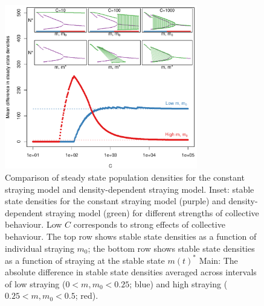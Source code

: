 \documentclass{revtex4}
\begin{document}
\begin{figure}
  \captionsetup{justification=raggedright,
singlelinecheck=false
}
\centering
\includegraphics[width=0.75\textwidth]{fig_meandiff.pdf}
\caption{
Comparison of steady state population densities for the constant straying model and density-dependent straying model.
Inset: stable state densities for the constant straying model (purple) and density-dependent straying model (green) for different strengths of collective behaviour.
Low $C$ corresponds to strong effects of collective behaviour.
The top row shows stable state densities as a function of individual straying $m_0$; the bottom row shows stable state densities as a function of straying at the stable state $m(t)^*$
Main: The absolute difference in stable state densities averaged across intervals of low straying ($0 < m,m_0 < 0.25$; blue) and high straying ($0.25 < m,m_0 < 0.5$; red).
} \label{fig:cb}
\end{figure}
\end{document}
